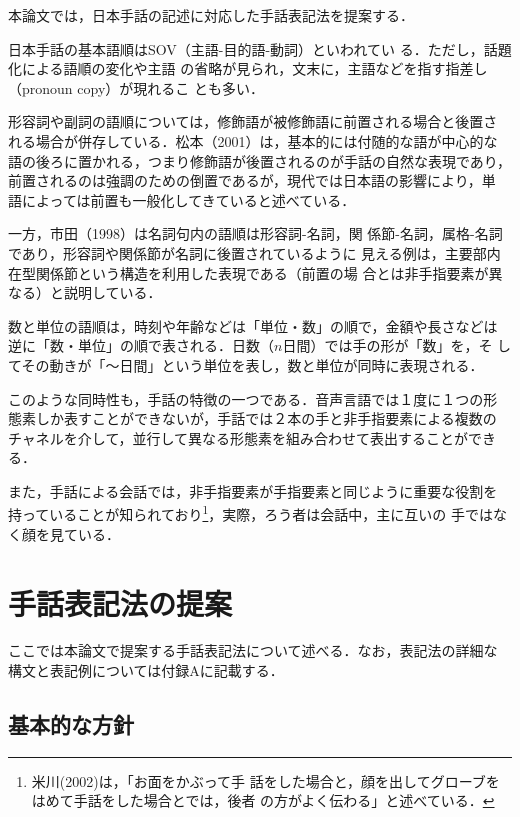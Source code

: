 本論文では，日本手話の記述に対応した手話表記法を提案する．

日本手話の基本語順はSOV（主語-目的語-動詞）といわれてい
る\cite{Kimura1995,Matsumoto2001}．ただし，話題化による語順の変化や主語
の省略が見られ，文末に，主語などを指す指差し（pronoun copy）が現れるこ
とも多い．

形容詞や副詞の語順については，修飾語が被修飾語に前置される場合と後置さ
れる場合が併存している．松本（2001）は，基本的には付随的な語が中心的な
語の後ろに置かれる，つまり修飾語が後置されるのが手話の自然な表現であり，
前置されるのは強調のための倒置であるが，現代では日本語の影響により，単
語によっては前置も一般化してきていると述べている．

一方，市田（1998）\nocite{Ichida1998}は名詞句内の語順は形容詞-名詞，関
係節-名詞，属格-名詞であり，形容詞や関係節が名詞に後置されているように
見える例は，主要部内在型関係節という構造を利用した表現である（前置の場
合とは非手指要素が異なる）と説明している．

数と単位の語順は，時刻や年齢などは「単位・数」の順で，金額や長さなどは
逆に「数・単位」の順で表される．日数（$n$日間）では手の形が「数」を，そ
してその動きが「〜日間」という単位を表し，数と単位が同時に表現される．

このような同時性も，手話の特徴の一つである．音声言語では１度に１つの形
態素しか表すことができないが，手話では２本の手と非手指要素による複数の
チャネルを介して，並行して異なる形態素を組み合わせて表出することができ
る．

\renewcommand{\thefootnote}{}
\setcounter{footnote}{0}

また，手話による会話では，非手指要素が手指要素と同じように重要な役割を
持っていることが知られており\footnote{米川(2002)は，「お面をかぶって手
  話をした場合と，顔を出してグローブをはめて手話をした場合とでは，後者
  の方がよく伝わる」と述べている．}，実際，ろう者は会話中，主に互いの
手ではなく顔を見ている\cite{Sutton-Spence1999}．

\section{手話表記法の提案}

ここでは本論文で提案する手話表記法について述べる．なお，表記法の詳細な
構文と表記例については付録Aに記載する．

\subsection{基本的な方針}

